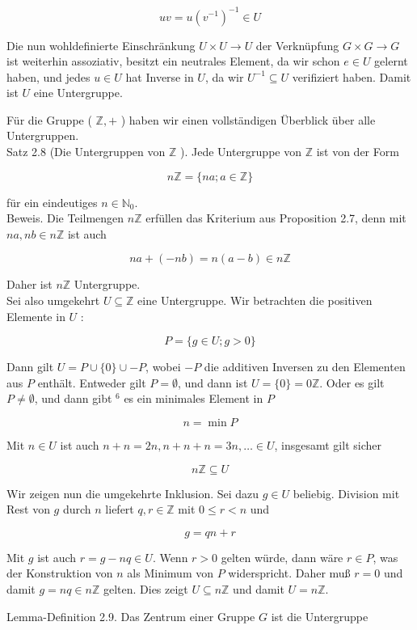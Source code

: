 \documentclass[10pt, letterpaper]{article}
\begin{document}
$$
u v=u\left(v^{-1}\right)^{-1} \in U
$$

Die nun wohldefinierte Einschränkung $U \times U \rightarrow U$ der Verknüpfung $G \times G \rightarrow G$ ist weiterhin assoziativ, besitzt ein neutrales Element, da wir schon $e \in U$ gelernt haben, und jedes $u \in U$ hat Inverse in $U$, da wir $U^{-1} \subseteq U$ verifiziert haben. Damit ist $U$ eine Untergruppe.

Für die Gruppe ( $\mathbb{Z},+$ ) haben wir einen vollständigen Überblick über alle Untergruppen.\\
Satz 2.8 (Die Untergruppen von $\mathbb{Z}$ ). Jede Untergruppe von $\mathbb{Z}$ ist von der Form

$$
n \mathbb{Z}=\{n a ; a \in \mathbb{Z}\}
$$

für ein eindeutiges $n \in \mathbb{N}_{0}$.\\
Beweis. Die Teilmengen $n \mathbb{Z}$ erfüllen das Kriterium aus Proposition 2.7, denn mit $n a, n b \in n \mathbb{Z}$ ist auch

$$
n a+(-n b)=n(a-b) \in n \mathbb{Z}
$$

Daher ist $n \mathbb{Z}$ Untergruppe.\\
Sei also umgekehrt $U \subseteq \mathbb{Z}$ eine Untergruppe. Wir betrachten die positiven Elemente in $U$ :

$$
P=\{g \in U ; g>0\}
$$

Dann gilt $U=P \cup\{0\} \cup-P$, wobei $-P$ die additiven Inversen zu den Elementen aus $P$ enthält. Entweder gilt $P=\emptyset$, und dann ist $U=\{0\}=0 \mathbb{Z}$. Oder es gilt $P \neq \emptyset$, und dann gibt ${ }^{6}$ es ein minimales Element in $P$

$$
n=\min P
$$

Mit $n \in U$ ist auch $n+n=2 n, n+n+n=3 n, \ldots \in U$, insgesamt gilt sicher

$$
n \mathbb{Z} \subseteq U
$$

Wir zeigen nun die umgekehrte Inklusion. Sei dazu $g \in U$ beliebig. Division mit Rest von $g$ durch $n$ liefert $q, r \in \mathbb{Z}$ mit $0 \leq r<n$ und

$$
g=q n+r
$$

Mit $g$ ist auch $r=g-n q \in U$. Wenn $r>0$ gelten würde, dann wäre $r \in P$, was der Konstruktion von $n$ als Minimum von $P$ widerspricht. Daher muß $r=0$ und damit $g=n q \in n \mathbb{Z}$ gelten. Dies zeigt $U \subseteq n \mathbb{Z}$ und damit $U=n \mathbb{Z}$.

Lemma-Definition 2.9. Das Zentrum einer Gruppe $G$ ist die Untergruppe
\end{document}
